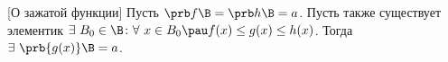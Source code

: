 [О зажатой функции]
 Пусть $\prb f\B=\prb h\B=a$. Пусть также существует элементик $\exists\  B_0\in\B\colon \forall\  x\in B_0\pau f(x)\leq g(x)\leq h(x)$.
 Тогда $\exists\  \prb{g(x)}\B=a$.
 